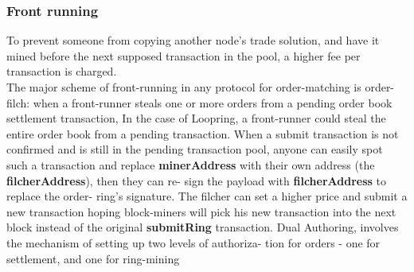 \documentclass[]{article}
\begin{document}
		\subsubsection{Front running}
		To prevent someone from copying another node's trade solution, 
		and have it mined before the next supposed transaction in the pool, 
		a higher fee per transaction is charged.\\ 
		The major scheme of front-running in any protocol for
		order-matching is order-filch: when a front-runner steals
		one or more orders from a pending order book settlement
		transaction, In the case of Loopring, a front-runner
		could steal the entire order book from a pending transaction.
		When a submit transaction is not confirmed and
		is still in the pending transaction pool, anyone can easily
		spot such a transaction and replace \textbf{minerAddress} with
		their own address (the \textbf{filcherAddress}), then they can re-
		sign the payload with \textbf{filcherAddress} to replace the order-
		ring's signature. The filcher can set a higher price and
		submit a new transaction hoping block-miners will pick his
		new transaction into the next block instead of the original
		\textbf{submitRing} transaction.
		Dual Authoring, involves the mechanism of setting up two levels of authoriza-
		tion for orders - one for settlement, and one for ring-mining
\end{document}
